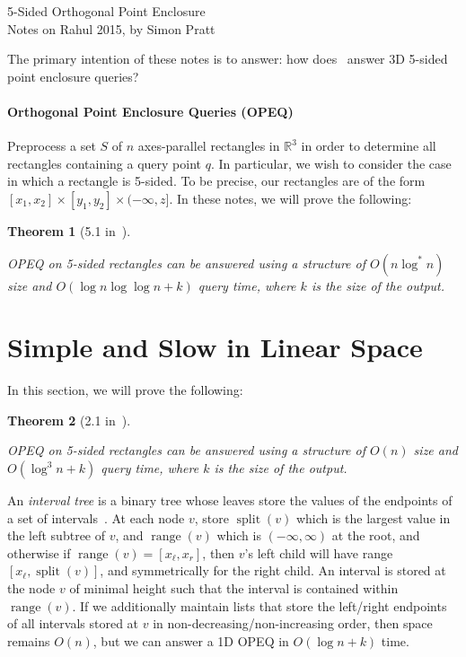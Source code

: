 \documentclass[letterpaper,12pt,twocolumn]{article}
\DeclareMathOperator{\splt}{split}
\DeclareMathOperator{\range}{range}
\newcommand{\BigOh}[1]{O\!\left(#1\right)}
\newcommand\IR{\mathbb{R}}
\newcommand\bounds[1]{[#1]}
\newcommand\lbounds[1]{(#1]} %
\theoremstyle{plain}
\newtheorem{theorem}{Theorem}
\begin{document}
{\noindent\Large 5-Sided Orthogonal Point Enclosure}\\
{\noindent Notes on Rahul 2015, by Simon Pratt}

The primary intention of these notes is to answer: how
does~\cite{saladi2015improved} answer 3D 5-sided point enclosure
queries?

\paragraph{Orthogonal Point Enclosure Queries (OPEQ)}
Preprocess a set $S$ of $n$ axes-parallel rectangles in $\IR^3$ in
order to determine all rectangles containing a query point $q$.  In
particular, we wish to consider the case in which a rectangle is
5-sided.  To be precise, our rectangles are of the form
$\bounds{x_1,x_2} \times \bounds{y_1, y_2} \times
\lbounds{-\infty,z}$.  In these notes, we will prove the following:

\begin{theorem}[5.1 in~\cite{saladi2015improved}]\label{thm:51}

  OPEQ on 5-sided rectangles can be answered using a structure of
  $\BigOh{n\log^* n}$ size and $\BigOh{\log n \log\log n + k}$ query
  time, where $k$ is the size of the output.

\end{theorem}

\section{Simple and Slow in Linear Space}

In this section, we will prove the following:

\begin{theorem}[2.1 in~\cite{saladi2015improved}]\label{thm:21}

  OPEQ on 5-sided rectangles can be answered using a structure of
  $\BigOh{n}$ size and $\BigOh{\log^3 n + k}$ query time, where $k$
  is the size of the output.

\end{theorem}

An \emph{interval tree} is a binary tree whose leaves store the values
of the endpoints of a set of intervals~\cite{edelsbrunner1983new}.  At
each node $v$, store $\splt(v)$ which is the largest value in the left
subtree of $v$, and $\range(v)$ which is $(-\infty,\infty)$ at the
root, and otherwise if $\range(v) = [x_\ell, x_r]$, then $v$'s left
child will have range $[x_\ell, \splt(v)]$, and symmetrically for the
right child.  An interval is stored at the node $v$ of minimal height
such that the interval is contained within $\range(v)$.  If we
additionally maintain lists that store the left/right endpoints of all
intervals stored at $v$ in non-decreasing/non-increasing order, then
space remains $\BigOh{n}$, but we can answer a 1D OPEQ in $\BigOh{\log
  n + k}$ time.
\end{document}
